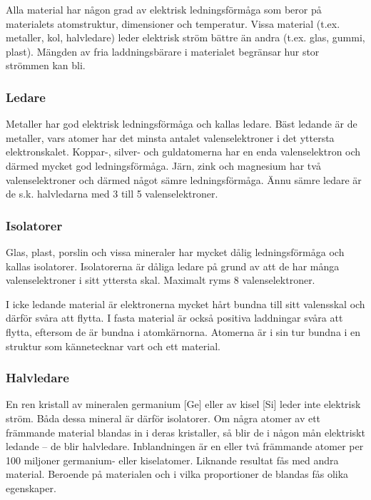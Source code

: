 Alla material har någon grad av elektrisk ledningsförmåga som beror på
materialets atomstruktur, dimensioner och temperatur.
Vissa material (t.ex. metaller, kol, halvledare) leder elektrisk ström bättre
än andra (t.ex. glas, gummi, plast).
Mängden av fria laddningsbärare i materialet begränsar hur stor strömmen kan
bli.

\subsubsection{Ledare}

Metaller har god elektrisk ledningsförmåga och kallas ledare.
Bäst ledande är de metaller, vars atomer har det minsta antalet
valenselektroner i det yttersta elektronskalet.
Koppar-, silver- och guldatomerna har en enda valenselektron och därmed mycket
god ledningsförmåga.
Järn, zink och magnesium har två valenselektroner och därmed något sämre
ledningsförmåga.
Ännu sämre ledare är de s.k. halvledarna med 3 till 5 valenselektroner.

\subsubsection{Isolatorer}

Glas, plast, porslin och vissa mineraler har mycket dålig ledningsförmåga och
kallas isolatorer.
Isolatorerna är dåliga ledare på grund av att de har många valenselektroner i
sitt yttersta skal.
Maximalt ryms 8 valenselektroner.

I icke ledande material är elektronerna mycket hårt bundna till sitt valensskal
och därför svåra att flytta.
I fasta material är också positiva laddningar svåra att flytta, eftersom de är
bundna i atomkärnorna.
Atomerna är i sin tur bundna i en struktur som kännetecknar vart och ett
material.

\subsubsection{Halvledare}

En ren kristall av mineralen germanium [Ge] eller av kisel [Si] leder
inte elektrisk ström.
Båda dessa mineral är därför isolatorer.
Om några atomer av ett främmande material blandas in i deras kristaller, så
blir de i någon mån elektriskt ledande -- de blir halvledare.
Inblandningen är en eller två främmande atomer per 100 miljoner germanium- eller
kiselatomer.
Liknande resultat fås med andra material.
Beroende på materialen och i vilka proportioner de blandas fås olika egenskaper.

